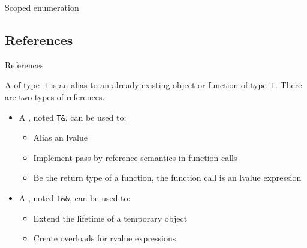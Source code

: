 \begin{frame}{Scoped enumeration}{}
  \begin{example}
  \end{example}
\end{frame}

\subsection{References}

\begin{frame}{References}{}
  \begin{definitions}[References]
    A  of type~\lstinline!T! is an alias to an already existing object or function of type~\lstinline!T!. There are two types of references.
    \begin{itemize}
    \item
      A , noted \lstinline!T&!, can be used to:
      \begin{itemize}
      \item
        Alias an lvalue
      \item
        Implement pass-by-reference semantics in function calls
      \item
        Be the return type of a function, the function call is an lvalue expression
      \end{itemize}
    \item
      A , noted \lstinline!T&&!, can be used to:
      \begin{itemize}
      \item
        Extend the lifetime of a temporary object
      \item
        Create overloads for rvalue expressions
      \end{itemize}
    \end{itemize}
  \end{definitions}
\end{frame}


